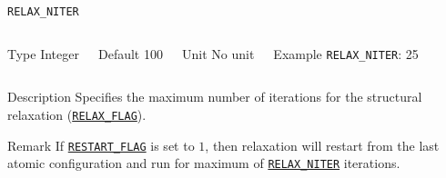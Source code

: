 \documentclass[xcolor=dvipsnames,t]{beamer}
\begin{document}
\begin{frame}[allowframebreaks]{\texttt{RELAX\_NITER}} \label{RELAX_NITER}
\vspace*{-12pt}
\begin{columns}
\begin{block}{Type}
Integer
\end{block}

\begin{block}{Default}
100
\end{block}

\begin{block}{Unit}
No unit
\end{block}

\begin{block}{Example}
\texttt{RELAX\_NITER}: 25
\end{block}
\end{columns}

\begin{block}{Description}
Specifies the maximum number of iterations for the structural relaxation (\hyperlink{RELAX_FLAG}{\texttt{RELAX\_FLAG}}).
\end{block}

\begin{block}{Remark}
If \hyperlink{RESTART_FLAG}{\texttt{RESTART\_FLAG}} is set to $1$, then relaxation will restart from the last atomic configuration and run for maximum of \hyperlink{RELAX_NITER}{\texttt{RELAX\_NITER}} iterations. 
\end{block}

\end{frame}
\end{document}

